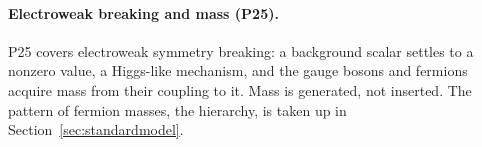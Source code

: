 \paragraph{Electroweak breaking and mass (P25).}
P25 covers electroweak symmetry breaking: a background scalar settles to a nonzero value, a
Higgs-like mechanism, and the gauge bosons and fermions acquire mass from their coupling to it. Mass
is generated, not inserted. The pattern of fermion masses, the hierarchy, is taken up in
Section~\ref{sec:standardmodel}.
